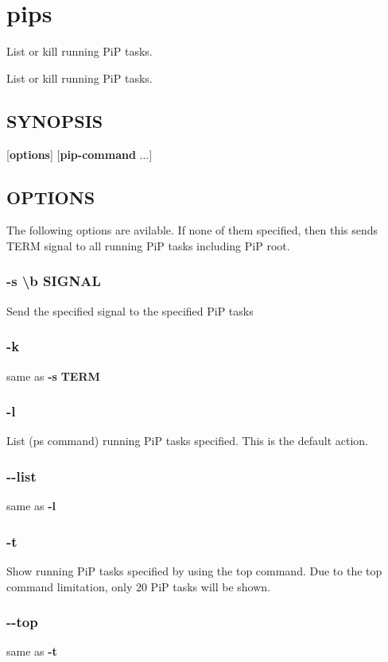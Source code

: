 \hypertarget{group__pips}{\section{pips}
\label{group__pips}
}


List or kill running Pi\-P tasks.  


List or kill running Pi\-P tasks. \hypertarget{group__piplnlibs_synopsis}{}\subsection{S\-Y\-N\-O\-P\-S\-I\-S}\label{group__piplnlibs_synopsis}
{ }\mbox{[}{\bfseries options}\mbox{]} \mbox{[}{\bfseries pip-\/command} ...\mbox{]}\hypertarget{group__piplnlibs_options}{}\subsection{O\-P\-T\-I\-O\-N\-S}\label{group__piplnlibs_options}
The following options are avilable. If none of them specified, then this sends T\-E\-R\-M signal to all running Pi\-P tasks including Pi\-P root.\hypertarget{group__pips_signal}{}\subsubsection{-\/s \textbackslash{}b S\-I\-G\-N\-A\-L}\label{group__pips_signal}
Send the specified signal to the specified Pi\-P tasks\hypertarget{group__pips_kill}{}\subsubsection{-\/k}\label{group__pips_kill}
same as {\bfseries -\/s} {\bfseries T\-E\-R\-M} \hypertarget{group__pips_list}{}\subsubsection{-\/l}\label{group__pips_list}
List (ps command) running Pi\-P tasks specified. This is the default action.\hypertarget{group__pips_list-long}{}\subsubsection{-\/-\/list}\label{group__pips_list-long}
same as {\bfseries -\/l} \hypertarget{group__pips_top}{}\subsubsection{-\/t}\label{group__pips_top}
Show running Pi\-P tasks specified by using the top command. Due to the top command limitation, only 20 Pi\-P tasks will be shown.\hypertarget{group__pips_top-long}{}\subsubsection{-\/-\/top}\label{group__pips_top-long}
same as {\bfseries -\/t} 